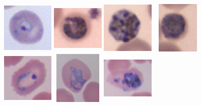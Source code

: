 \begin{figure}[H]
	\centering
	\includegraphics[width=2.5cm, height=2.5cm]{images/malaria/falciparum_1_ring}
	\includegraphics[width=2.5cm, height=2.5cm]{images/malaria/falciparum_2_trophozoiteAge}
	\includegraphics[width=2.5cm, height=2.5cm]{images/malaria/falciparum_3_schizont}
	\includegraphics[width=2.5cm, height=2.5cm]{images/malaria/falciparum_4_gametocyte}
	\includegraphics[width=2.5cm, height=2.5cm]{images/malaria/ovale_1_ring}
	\includegraphics[width=2.5cm, height=2.5cm]{images/malaria/ovale_2_trophozoite}
	\includegraphics[width=2.5cm, height=2.5cm]{images/malaria/ovale_3_schizont}

\end{figure}
